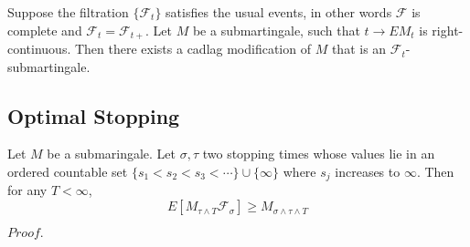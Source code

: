 \documentclass{article}
\newcommand{\Pf}[1]{$Proof.$\par}
\newcommand{\F}{\mathcal{F}}
\begin{document}
\begin{proposition}
    Suppose the filtration $\{\F_t\}$ satisfies the usual events, in other words $\F$ is complete and $\F_t = \F_{t+}$. Let $M$ be a submartingale, such that $t\to EM_t$ is right-continuous. Then there exists a cadlag modification of $M$ that is an $\F_t$-submartingale.
\end{proposition}

\subsection{Optimal Stopping}

\begin{lemma}
    Let $M$ be a submaringale. Let $\sigma, \tau$ two stopping times whose values lie in an ordered countable set $\{s_1<s_2<s_3<\cdots\}\cup\{\infty\}$ where $s_j$ increases to $\infty$. Then for any $T<\infty$,
    \[E[M_{\tau\wedge T}\F_{\sigma}] \geq M_{\sigma \wedge \tau \wedge T}\]
\end{lemma}
\Pf\par






\end{document}
